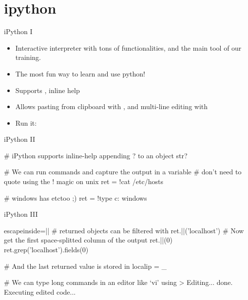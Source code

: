 \section{ipython}



\begin{pyframe}{iPython I}
\begin{itemize}
\item Interactive interpreter with tons of                                                                                                        functionalities, and the main tool of our training.                                                                                                      
\item   The most fun way to learn and use python!

\item   Supports , inline help 

\item   Allows pasting from clipboard with  , 
    and multi-line editing with 

\item   Run it: \\
\end{itemize}

\end{pyframe}


\begin{pyframe}{iPython II}
\begin{pycode}
# iPython supports inline-help appending ? to an object
str?

# We can run commands and capture the output in a variable
# don't need to quote using the ! magic on unix
ret = !cat /etc/hosts

# windows has etc\hosts too ;)
ret = !type c: windows\drivers\etc\hosts
\end{pycode}
\end{pyframe}


\begin{pyframe}{iPython III}
\begin{pycode*}{escapeinside=||}
# returned objects can be filtered with  
ret.||('localhost')
# Now get the first space-splitted column of the output
ret.||(0)
ret.grep('localhost').fields(0)

# And the last returned value is stored in 
localip = _

# We can type long commands in an editor like `vi' using
> Editing... done. Executing edited code...

\end{pycode*}
\end{pyframe}

